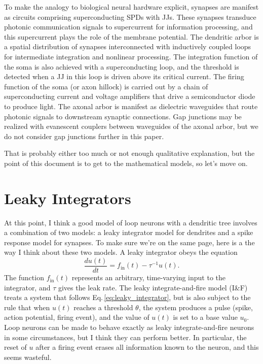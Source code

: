 \documentclass[]{article}
\begin{document}
To make the analogy to biological neural hardware explicit, synapses are manifest as circuits comprising superconducting SPDs with JJs. These synapses transduce photonic communication signals to supercurrent for information processing, and this supercurrent plays the role of the membrane potential. The dendritic arbor is a spatial distribution of synapses interconnected with inductively coupled loops for intermediate integration and nonlinear processing. The integration function of the soma is also achieved with a superconducting loop, and the threshold is detected when a JJ in this loop is driven above its critical current. The firing function of the soma (or axon hillock) is carried out by a chain of superconducting current and voltage amplifiers that drive a semiconductor diode to produce light. The axonal arbor is manifest as dielectric waveguides that route photonic signals to downstream synaptic connections. Gap junctions may be realized with evanescent couplers between waveguides of the axonal arbor, but we do not consider gap junctions further in this paper.

That is probably either too much or not enough qualitative explanation, but the point of this document is to get to the mathematical models, so let's move on.

\section{\label{sec:leaky_integrators}Leaky Integrators}
At this point, I think a good model of loop neurons with a dendritic tree involves a combination of two models: a leaky integrator model for dendrites and a spike response model for synapses. To make sure we're on the same page, here is a the way I think about these two models. A leaky integrator obeys the equation
\begin{equation}
\label{eq:leaky_integrator}
\frac{du(t)}{dt} = f_{\mathrm{in}}(t)-\tau^{-1}u(t).
\end{equation}
The function $f_{\mathrm{in}}(t)$ represents an arbitrary, time-varying input to the integrator, and $\tau$ gives the leak rate. The leaky integrate-and-fire model (I\&F) treats a system that follows Eq.\,\ref{eq:leaky_integrator}, but is also subject to the rule that when $u(t)$ reaches a threshold $\theta$, the system produces a pulse (spike, action potential, firing event), and the value of $u(t)$ is set to a base value $u_0$. Loop neurons can be made to behave exactly as leaky integrate-and-fire neurons in some circumstances, but I think they can perform better. In particular, the reset of $u$ after a firing event erases all information known to the neuron, and this seems wasteful.  
\end{document}
